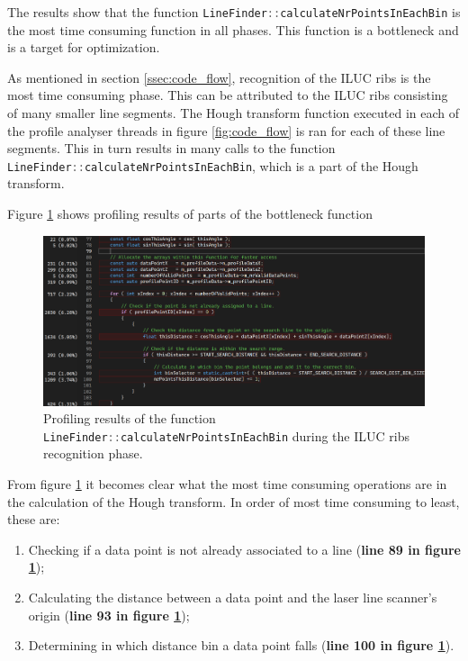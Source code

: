 

The results show that the function \lstinline[language=c]|LineFinder::calculateNrPointsInEachBin| is the most time consuming function in all phases. This function is a bottleneck and is a target for optimization.

As mentioned in section \ref{ssec:code_flow}, recognition of the ILUC ribs is the most time consuming phase. This can be attributed to the ILUC ribs consisting of many smaller line segments. The Hough transform function executed in each of the profile analyser threads in figure
\ref{fig:code_flow} is ran for each of these line segments. This in turn results in many calls to the function \lstinline[language=c]|LineFinder::calculateNrPointsInEachBin|, which is a part of the Hough transform.

Figure \ref{fig:profiling_bottleneck} shows profiling results of parts of the bottleneck function
\begin{figure}[H]
    \includegraphics[width=\textwidth]{images/profiling_bottleneck.png}
    \caption{Profiling results of the function \lstinline[language=c]|LineFinder::calculateNrPointsInEachBin| during the ILUC ribs recognition phase.}
    \label{fig:profiling_bottleneck}
\end{figure}

From figure \ref{fig:profiling_bottleneck} it becomes clear what the most time consuming operations are in the calculation of the Hough transform. In order of most time consuming to least, these are:
\begin{enumerate}[label=\textbf{B.N. \arabic*},ref=Bottle Neck \arabic*]
    \item \label{bottlen:line_assocation} Checking if a data point is not already associated to a line (\textbf{line 89 in figure \ref{fig:profiling_bottleneck}});
    \item \label{bottlen:calc_distance} Calculating the distance between a data point and the laser line scanner's origin (\textbf{line 93 in figure \ref{fig:profiling_bottleneck}});
    \item \label{bottlen:bin_assocation}  Determining in which distance bin a data point falls (\textbf{line 100 in figure \ref{fig:profiling_bottleneck}}).
\end{enumerate}